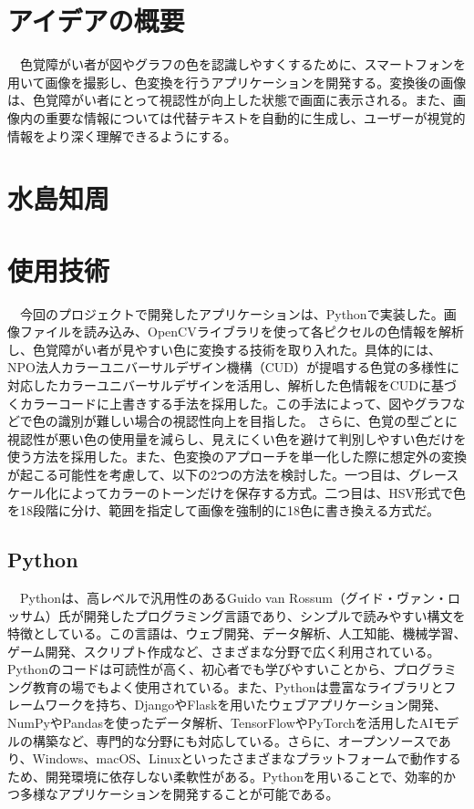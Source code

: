 \section{アイデアの概要}
　色覚障がい者が図やグラフの色を認識しやすくするために、スマートフォンを用いて画像を撮影し、色変換を行うアプリケーションを開発する。変換後の画像は、色覚障がい者にとって視認性が向上した状態で画面に表示される。また、画像内の重要な情報については代替テキストを自動的に生成し、ユーザーが視覚的情報をより深く理解できるようにする。
\section{水島知周}
\section{使用技術}
　今回のプロジェクトで開発したアプリケーションは、Pythonで実装した。画像ファイルを読み込み、OpenCVライブラリを使って各ピクセルの色情報を解析し、色覚障がい者が見やすい色に変換する技術を取り入れた。具体的には、NPO法人カラーユニバーサルデザイン機構（CUD）が提唱する色覚の多様性に対応したカラーユニバーサルデザインを活用し、解析した色情報をCUDに基づくカラーコードに上書きする手法を採用した。この手法によって、図やグラフなどで色の識別が難しい場合の視認性向上を目指した。
さらに、色覚の型ごとに視認性が悪い色の使用量を減らし、見えにくい色を避けて判別しやすい色だけを使う方法を採用した。また、色変換のアプローチを単一化した際に想定外の変換が起こる可能性を考慮して、以下の2つの方法を検討した。一つ目は、グレースケール化によってカラーのトーンだけを保存する方式。二つ目は、HSV形式で色を18段階に分け、範囲を指定して画像を強制的に18色に書き換える方式だ。

\subsection{Python}
　Pythonは、高レベルで汎用性のあるGuido van Rossum（グイド・ヴァン・ロッサム）氏が開発したプログラミング言語であり、シンプルで読みやすい構文を特徴としている。この言語は、ウェブ開発、データ解析、人工知能、機械学習、ゲーム開発、スクリプト作成など、さまざまな分野で広く利用されている。Pythonのコードは可読性が高く、初心者でも学びやすいことから、プログラミング教育の場でもよく使用されている。また、Pythonは豊富なライブラリとフレームワークを持ち、DjangoやFlaskを用いたウェブアプリケーション開発、NumPyやPandasを使ったデータ解析、TensorFlowやPyTorchを活用したAIモデルの構築など、専門的な分野にも対応している。さらに、オープンソースであり、Windows、macOS、Linuxといったさまざまなプラットフォームで動作するため、開発環境に依存しない柔軟性がある。Pythonを用いることで、効率的かつ多様なアプリケーションを開発することが可能である。
